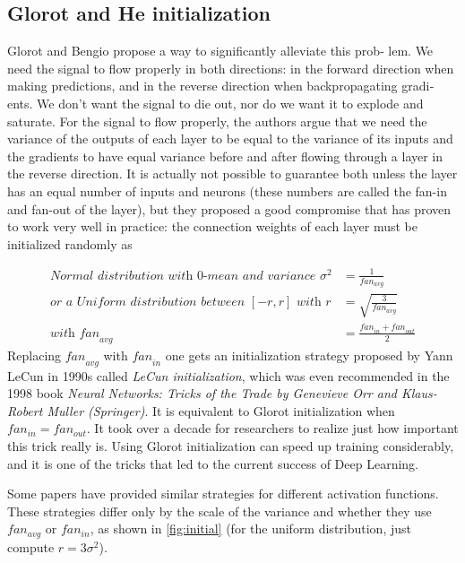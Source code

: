 \documentclass[12pt, letterpaper]{article}
\theoremstyle{definition}
\let\ti\textit
\begin{document}
\subsection{Glorot and He initialization}
Glorot and Bengio propose a way to significantly alleviate this prob‐ lem. We need the signal to flow properly in both directions: in the forward direction when making predictions, and in the reverse direction when backpropagating gradi‐ ents. We don’t want the signal to die out, nor do we want it to explode and saturate. For the signal to flow properly, the authors argue that we need the variance of the outputs of each layer to be equal to the variance of its inputs and the gradients to have equal variance before and after flowing through a layer in the reverse direction. It is actually not possible to guarantee both unless the layer has an equal number of inputs and neurons (these numbers are called the fan-in and fan-out of the layer), but they proposed a good compromise that has proven to work very well in practice: the connection weights of each layer must be initialized randomly as

\begin{equation}
\begin{aligned}
\textit{Normal distribution with $0$-mean and variance } \sigma^2 &= \frac{1}{fan_{avg}}\\
\textit{or a Uniform distribution between $[-r, r]$ with } r &= \sqrt{\frac{3}{fan_{avg}}}\\
\textit{with} \textit{ fan}_{avg} &=\frac{\textit{fan}_{in} + \textit{fan}_{out}}{2}
\end{aligned}
\end{equation}
Replacing $\textit{fan}_{avg}$ with $\textit{fan}_{in}$ one gets an initialization strategy proposed by Yann LeCun in 1990s called \ti{LeCun initialization}, which was even recommended in the 1998 book \ti{Neural Networks: Tricks of the Trade by Genevieve Orr and Klaus-Robert Muller (Springer)}. It is equivalent to Glorot initialization when $fan_{in} = fan_{out}$. It took over a decade for researchers to realize just how important this trick really is. Using Glorot initialization can speed up training considerably, and it is one of the tricks that led to the current success of Deep Learning.

Some papers have provided similar strategies for different activation functions. These strategies differ only by the scale of the variance and whether they use $fan_{avg}$ or $fan_{in}$, as shown in \autoref{fig:initial} (for the uniform distribution, just compute $r = 3\sigma^2$). 
\end{document}
